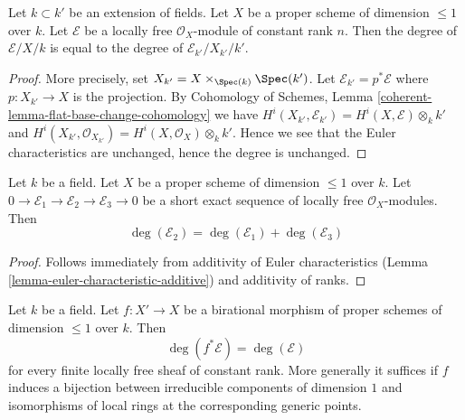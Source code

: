 \begin{lemma}
\label{lemma-degree-base-change}
Let $k \subset k'$ be an extension of fields. Let $X$ be a proper scheme of
dimension $\leq 1$ over $k$. Let $\mathcal{E}$ be a locally free
$\mathcal{O}_X$-module of constant rank $n$. Then the degree of
$\mathcal{E}/X/k$ is equal to the degree of
$\mathcal{E}_{k'}/X_{k'}/k'$.
\end{lemma}

\begin{proof}
More precisely, set $X_{k'} = X \times_{\Spec(k)} \Spec(k')$.
Let $\mathcal{E}_{k'} = p^*\mathcal{E}$ where $p : X_{k'} \to X$
is the projection. By
Cohomology of Schemes, Lemma \ref{coherent-lemma-flat-base-change-cohomology}
we have
$H^i(X_{k'}, \mathcal{E}_{k'}) = H^i(X, \mathcal{E}) \otimes_k k'$
and
$H^i(X_{k'}, \mathcal{O}_{X_{k'}}) = H^i(X, \mathcal{O}_X) \otimes_k k'$.
Hence we see that the Euler characteristics are unchanged, hence the
degree is unchanged.
\end{proof}

\begin{lemma}
\label{lemma-degree-additive}
Let $k$ be a field. Let $X$ be a proper scheme of dimension $\leq 1$
over $k$. Let $0 \to \mathcal{E}_1 \to \mathcal{E}_2 \to \mathcal{E}_3 \to 0$
be a short exact sequence of locally free $\mathcal{O}_X$-modules. Then
$$
\deg(\mathcal{E}_2) = \deg(\mathcal{E}_1) + \deg(\mathcal{E}_3)
$$
\end{lemma}

\begin{proof}
Follows immediately from additivity of Euler characteristics
(Lemma \ref{lemma-euler-characteristic-additive})
and additivity of ranks.
\end{proof}

\begin{lemma}
\label{lemma-degree-birational-pullback}
Let $k$ be a field. Let $f : X' \to X$ be a birational morphism of
proper schemes of dimension $\leq 1$ over $k$. Then
$$
\deg(f^*\mathcal{E}) = \deg(\mathcal{E})
$$
for every finite locally free sheaf of constant rank. More generally
it suffices if $f$ induces a bijection between irreducible components
of dimension $1$ and isomorphisms of local rings at the corresponding
generic points.
\end{lemma}

